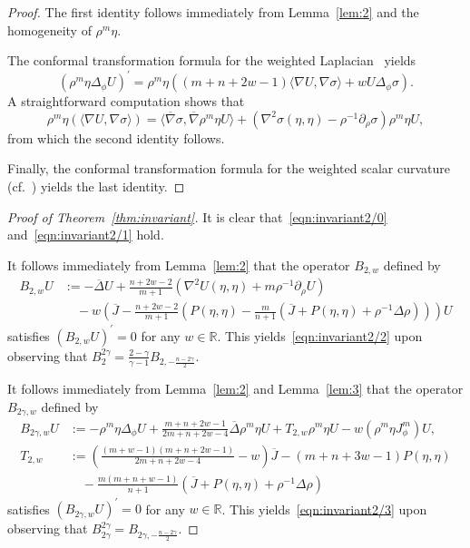 \documentclass{amsart}
\theoremstyle{definition}
\theoremstyle{remark}
\numberwithin{equation}{section}
\begin{document}
\begin{proof}
 The first identity follows immediately from Lemma~\ref{lem:2} and the homogeneity of $\rho^m\eta$.

 The conformal transformation formula for the weighted Laplacian~\cite{Case2010a} yields
 \[ \left(\rho^m\eta\Delta_\phi U\right)^\prime = \rho^m\eta\left((m+n+2w-1){\langle}\nabla U,\nabla\sigma{\rangle} + wU\Delta_\phi\sigma\right) . \]
 A straightforward computation shows that
 \[ \rho^m\eta\left({\langle}\nabla U,\nabla\sigma{\rangle}\right) = {\langle}{\overline{\nabla}}\sigma,{\overline{\nabla}}\rho^m\eta U{\rangle} + \left(\nabla^2\sigma(\eta,\eta) - \rho^{-1}\partial_\rho\sigma\right)\rho^m\eta U , \]
 from which the second identity follows.

 Finally, the conformal transformation formula for the weighted scalar curvature (cf.\ \cite[Proposition~4.4]{Case2010a}) yields the last identity.
\end{proof}

\begin{proof}[Proof of Theorem~\ref{thm:invariant}]
 It is clear that~\eqref{eqn:invariant2/0} and~\eqref{eqn:invariant2/1} hold.

 It follows immediately from Lemma~\ref{lem:2} that the operator $B_{2,w}$ defined by
 \begin{align*}
  B_{2,w}U & := -{\overline{\Delta}} U + \frac{n+2w-2}{m+1}\left(\nabla^2U(\eta,\eta) + m\rho^{-1}\partial_\rho U\right) \\
  & \quad - w\left({\overline{J}} - \frac{n+2w-2}{m+1}\left(P(\eta,\eta) - \frac{m}{n+1}\left({\overline{J}} + P(\eta,\eta) + \rho^{-1}\Delta\rho\right)\right)\right)U
 \end{align*}
 satisfies $\left(B_{2,w}U\right)^\prime=0$ for any $w\in{\mathbb{R}}$.  This yields~\eqref{eqn:invariant2/2} upon observing that $B_{2}^{2\gamma}=\frac{2-\gamma}{\gamma-1}B_{2,-\frac{n-2\gamma}{2}}$.

 It follows immediately from Lemma~\ref{lem:2} and Lemma~\ref{lem:3} that the operator $B_{2\gamma,w}$ defined by
 \begin{align*}
  B_{2\gamma,w}U & := -\rho^m\eta\Delta_\phi U + \frac{m+n+2w-1}{2m+n+2w-4}{\overline{\Delta}}\rho^m\eta U + T_{2,w}\rho^m\eta U - w\left(\rho^m\eta J_\phi^m\right)U, \\
  T_{2,w} & := \left(\frac{(m+w-1)(m+n+2w-1)}{2m+n+2w-4} - w\right){\overline{J}} - (m+n+3w-1)P(\eta,\eta) \\
  & \quad - \frac{m(m+n+w-1)}{n+1}\left({\overline{J}} + P(\eta,\eta) + \rho^{-1}\Delta\rho\right)
 \end{align*}
 satisfies $\left(B_{2\gamma,w}U\right)^\prime=0$ for any $w\in{\mathbb{R}}$.  This yields~\eqref{eqn:invariant2/3} upon observing that $B_{2\gamma}^{2\gamma}=B_{2\gamma,-\frac{n-2\gamma}{2}}$.
\end{proof}
\end{document}
